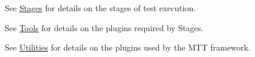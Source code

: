 See \hyperlink{group__Stages}{Stages} for details on the stages of test execution.\par
 See \hyperlink{group__Tools}{Tools} for details on the plugins required by Stages.\par
 See \hyperlink{group__Utilities}{Utilities} for details on the plugins used by the M\-T\-T framework.\par
